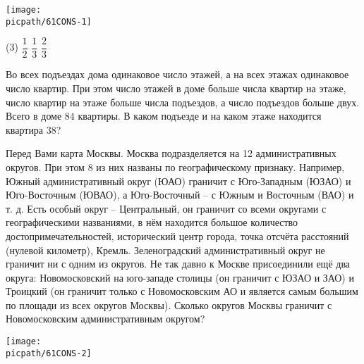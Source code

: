\begin{consultation}
\begin{listofex}
		\hspace{0.1\linewidth}
		\begin{minipage}[c]{250pt}
			\texttt{[image: \\picpath/61CONS-1]}
		\end{minipage}
		\begin{tasks}(3)
			\task \( \dfrac{1}{2} \)
			\task \( \dfrac{1}{3} \)
			\task \( \dfrac{2}{3} \)
		\end{tasks}
		\item Во всех подъездах дома одинаковое число этажей, а на всех этажах одинаковое число квартир. При этом число этажей в доме больше числа квартир на этаже, число квартир на этаже больше числа подъездов, а число подъездов больше двух. Всего в доме \(84\) квартиры. В каком подъезде и на каком этаже находится квартира \(38\)?
		\item 
		\begin{minipage}[t]{200pt}
		Перед Вами карта Москвы. Москва подразделяется на 12 административных округов. При этом 8 из них названы по географическому признаку. Например, Южный административный округ (ЮАО) граничит с Юго-Западным (ЮЗАО) и Юго-Восточным (ЮВАО), а Юго-Восточный – с Южным и Восточным (ВАО) и т. д. Есть особый округ – Центральный, он граничит со всеми округами с географическими названиями, в нём находится большое количество достопримечательностей, исторический центр города, точка отсчёта расстояний (нулевой километр), Кремль. Зеленоградский административный округ не граничит ни с одним из округов. Не так давно к Москве присоединили ещё два округа: Новомосковский на юго-западе столицы (он граничит с ЮЗАО и ЗАО) и Троицкий (он граничит только с Новомосковским АО и является самым большим по площади из всех округов Москвы). Сколько округов Москвы граничит с Новомосковским административным округом?
		\end{minipage}
	\hspace{0.01\linewidth}
		\begin{minipage}[t]{110pt}
		\texttt{[image: \\picpath/61CONS-2]}
		\end{minipage}
	\end{listofex}
\end{consultation}
